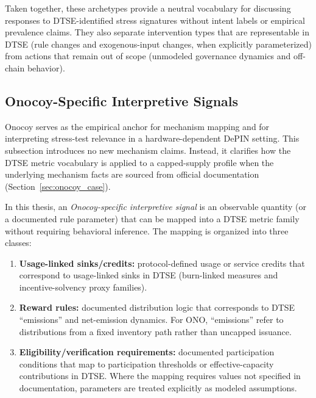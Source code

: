 \medskip
Taken together, these archetypes provide a neutral vocabulary for discussing responses to DTSE-identified stress signatures without intent labels or empirical prevalence claims. They also separate intervention types that are representable in DTSE (rule changes and exogenous-input changes, when explicitly parameterized) from actions that remain out of scope (unmodeled governance dynamics and off-chain behavior).

\subsection{Onocoy-Specific Interpretive Signals}
Onocoy serves as the empirical anchor for mechanism mapping and for interpreting stress-test relevance in a hardware-dependent DePIN setting. This subsection introduces no new mechanism claims. Instead, it clarifies how the DTSE metric vocabulary is applied to a capped-supply profile when the underlying mechanism facts are sourced from official documentation (Section~\ref{sec:onocoy_case}).

In this thesis, an \emph{Onocoy-specific interpretive signal} is an observable quantity (or a documented rule parameter) that can be mapped into a DTSE metric family without requiring behavioral inference. The mapping is organized into three classes:
\begin{enumerate}
    \item \textbf{Usage-linked sinks/credits:} protocol-defined usage or service credits that correspond to usage-linked sinks in DTSE (burn-linked measures and incentive-solvency proxy families).
    \item \textbf{Reward rules:} documented distribution logic that corresponds to DTSE ``emissions'' and net-emission dynamics. For ONO, ``emissions'' refer to distributions from a fixed inventory path rather than uncapped issuance.
    \item \textbf{Eligibility/verification requirements:} documented participation conditions that map to participation thresholds or effective-capacity contributions in DTSE. Where the mapping requires values not specified in documentation, parameters are treated explicitly as modeled assumptions.
\end{enumerate}

